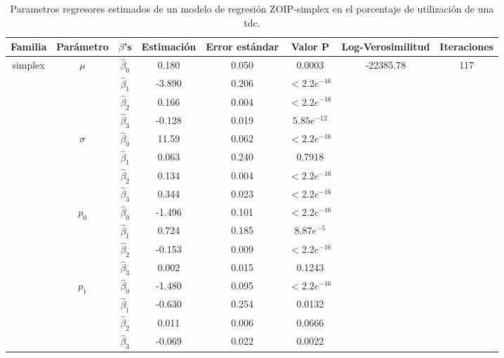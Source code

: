 \begin{table}[!hbt]
{\scriptsize
\begin{center}
\begin{tabular}{|c|c|c|ccc|c|c|}\hline
Familia & Par\'{a}metro & $\beta$'s & Estimaci\'{o}n & Error est\'{a}ndar & Valor P & Log-Verosimilitud & Iteraciones \\ \hline \hline
\multirow{12}{*}{simplex} & \multirow{4}{*}{$\mu$} & $\hat{\beta}_0$ & 0.180	&0.050	&0.0003  & \multirow{12}{*}{-22385.78} & \multirow{12}{*}{117} \\
& & $\hat{\beta}_1$ & -3.890	&0.206	&$<2.2e^{-16}$   & &\\
& & $\hat{\beta}_2$ & 0.166	&0.004	&$<2.2e^{-16}$   & &\\
& & $\hat{\beta}_3$ & -0.128	&0.019	&$5.85e^{-12}$   & &\\ \cline{2-6}
& \multirow{4}{*}{$\sigma$} & $\hat{\beta}_0$ & 11.59	&0.062	&$<2.2e^{-16}$   & &\\
& & $\hat{\beta}_1$ & 0.063	&0.240	&0.7918   & &\\
& & $\hat{\beta}_2$ & 0.134	&0.004	&$<2.2e^{-16}$  & &\\
& & $\hat{\beta}_3$ & 0.344	&0.023	&$<2.2e^{-16}$   & &\\ \cline{2-6}
& \multirow{4}{*}{$p_0$} & $\hat{\beta}_0$ & -1.496	&0.101	&$<2.2e^{-16}$  & &\\
& & $\hat{\beta}_1$ & 0.724	&0.185	&$8.87e^{-5}$  & &\\
& & $\hat{\beta}_2$ & -0.153	&0.009	&$<2.2e^{-16}$  & &\\
& & $\hat{\beta}_3$ & 0.002	&0.015	&0.1243  & &\\ \cline{2-6}
& \multirow{4}{*}{$p_1$} & $\hat{\beta}_0$ &-1.480	&0.095	&$<2.2e^{-16}$  & &\\
& & $\hat{\beta}_1$ & -0.630	&0.254	&0.0132  & &\\
& & $\hat{\beta}_2$ & 0.011	&0.006	&0.0666  & &\\
& & $\hat{\beta}_3$ & -0.069	&0.022	&0.0022  & &\\ \hline

\end{tabular}
\caption{Parametros regresores estimados de un modelo de regresi\'{o}n ZOIP-simplex en el porcentaje de utilizaci\'{o}n de una tdc.}
\label{T_Apli_CC_Sim}
\end{center}
}
\end{table}

